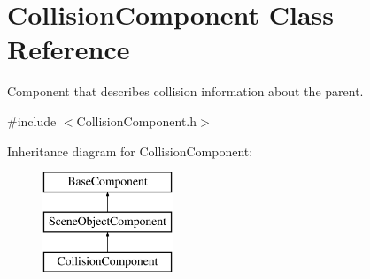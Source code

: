 \hypertarget{class_collision_component}{}\section{Collision\+Component Class Reference}
\label{class_collision_component}


Component that describes collision information about the parent.  




{\ttfamily \#include $<$Collision\+Component.\+h$>$}

Inheritance diagram for Collision\+Component\+:\begin{figure}[H]
\begin{center}
\leavevmode
\includegraphics[height=3.000000cm]{class_collision_component}
\end{center}
\end{figure}
